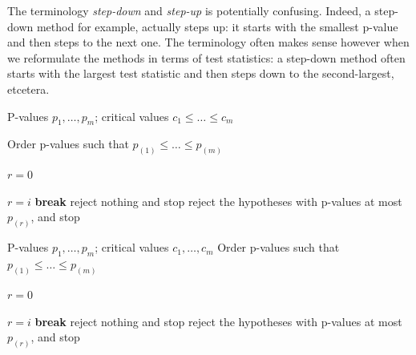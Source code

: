 \documentclass[11pt]{article}
\theoremstyle{plain}
\theoremstyle{definition}
\begin{document}
The terminology \emph{step-down} and \emph{step-up} is potentially confusing. Indeed, a step-down method for example, actually  steps up: it starts with the smallest p-value and then steps to the next one. The terminology often makes sense however when we reformulate the methods in terms of test statistics: a step-down method often starts with the largest test statistic and then steps down to the second-largest, etcetera.

\begin{algorithm}[H]
\caption{Step-down procedure based on p-values and fixed critical values.} \label{alg:stepdown}
\begin{algorithmic}[1]
\REQUIRE P-values $p_1, \dots, p_m$; critical values $c_1 \le \dots \le c_m$

\STATE Order p-values such that 
$p_{(1)} \le \dots \le p_{(m)}$


\STATE $r = 0$

        \STATE $r = i$
    \ELSE
        \STATE \textbf{break}
    \ENDIF
\ENDFOR
{}
	\STATE reject nothing and stop
\ELSE 
	 \STATE reject the hypotheses with p-values at most $p_{(r)}$, and stop
\ENDIF
\end{algorithmic}
\end{algorithm}






\begin{algorithm}[H] 
\caption{Step-up  procedure based on p-values and fixed critical values.} \label{alg:stepup}
\begin{algorithmic}[1]
\REQUIRE P-values $p_1, \dots, p_m$; critical values $c_1, \dots, c_m$
\STATE Order p-values such that 
$p_{(1)} \le  \dots \le p_{(m)}$



\STATE $r=0$

        \STATE $r=i$
        \STATE \textbf{break}
    \ENDIF
\ENDFOR
{}
	\STATE reject nothing and stop
\ELSE 
	 \STATE reject the hypotheses with p-values at most $p_{(r)}$, and stop
\ENDIF
\end{algorithmic}
\end{algorithm}
\end{document}
